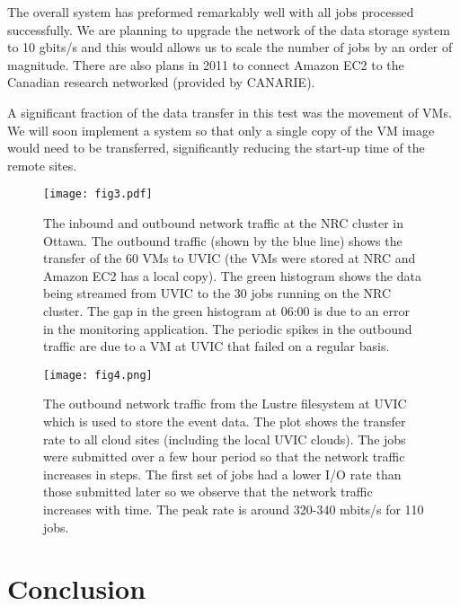 \documentclass[10pt, conference, compsocconf]{IEEEtran}
\begin{document}
The overall system has preformed remarkably well with all jobs 
processed successfully.
We are planning to upgrade the network of the data storage system to 
10 gbits/s and this would allows us to scale the number of jobs 
by an order of magnitude.
There are also plans in 2011 to connect Amazon EC2 to the Canadian research
networked (provided by CANARIE).

A significant fraction of the data transfer in this test was the 
movement of VMs.  
We will soon implement a system so that only a single copy of the VM
image would need to be transferred, significantly reducing the start-up
time of the remote sites.



\begin{figure*}[ht]
\begin{center}
\texttt{[image: fig3.pdf]}
\end{center}
\caption{\label{fig:nrc}
The inbound and outbound network traffic at the NRC cluster in Ottawa.
The outbound traffic (shown by the blue line) shows the transfer of the 60 VMs
to UVIC (the VMs were stored at NRC and Amazon EC2 has a local copy).
The green histogram shows the data being streamed from UVIC to the 30 jobs 
running on the NRC cluster.
The gap in the green histogram at 06:00 is due to an error in the monitoring 
application.
The periodic spikes in the outbound traffic are due to a VM at UVIC that
failed on a regular basis.
}
\end{figure*}


\begin{figure*}[ht]
\begin{center}
\texttt{[image: fig4.png]}
\end{center}
\caption{\label{fig:elephant}
The outbound network traffic from the Lustre filesystem at UVIC which 
is used to store the event data.
The plot shows the transfer rate to all cloud sites (including the local
UVIC clouds).
The jobs were submitted over a few hour period so that the 
network traffic increases in steps.
The first set of jobs had a lower I/O rate than those submitted later 
so we observe that the network traffic increases with time.
The peak rate is around 320-340 mbits/s for 110 jobs.
}
\end{figure*}


\section{Conclusion}
\end{document}
